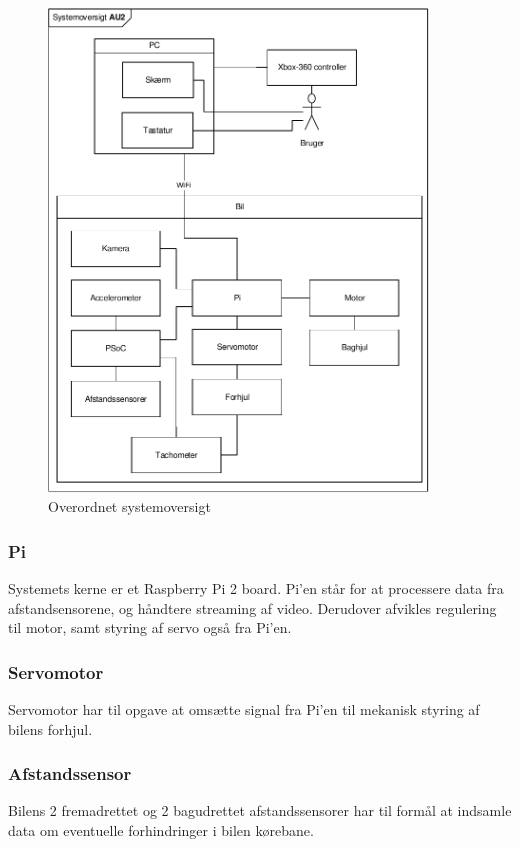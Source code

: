 \begin{figure}[h]
\centering
\includegraphics[width=0.9\textwidth]{../fig/diagrammer/systemoversigt.pdf}
\caption{Overordnet systemoversigt}
\label{fig:systemoversigt}
\end{figure}
\clearpage


\subsubsection{Pi}
Systemets kerne er et Raspberry Pi 2 board.
Pi'en står for at processere data fra afstandsensorene, og håndtere streaming af video. Derudover afvikles regulering til motor, samt styring af servo også fra Pi'en. 

\subsubsection{Servomotor}
Servomotor har til opgave at omsætte signal fra Pi'en til mekanisk styring af bilens forhjul. 

\subsubsection{Afstandssensor}
Bilens 2 fremadrettet og 2 bagudrettet afstandssensorer har til formål at indsamle data om eventuelle forhindringer i bilen kørebane. 

